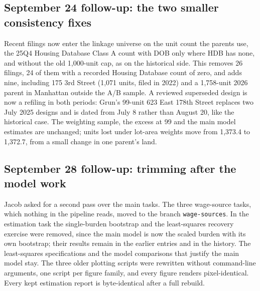 \subsection*{September 24 follow-up: the two smaller consistency fixes}

Recent filings now enter the linkage universe on the unit count the parents
use, the 25Q4 Housing Database Class A count with DOB only where HDB has none,
and without the old 1,000-unit cap, as on the historical side. This removes 26
filings, 24 of them with a recorded Housing Database count of zero, and adds
nine, including 175 3rd Street (1,071 units, filed in 2022) and a 1,758-unit
2026 parent in Manhattan outside the A/B sample. A reviewed superseded design
is now a refiling in both periods: Grun's 99-unit 623 East 178th Street replaces
two July 2025 designs and is dated from July 8 rather than August 20, like the
historical case. The weighting sample, the excess at 99 and the main model
estimates are unchanged; units lost under lot-area weights move from 1,373.4 to
1,372.7, from a small change in one parent's land.

\subsection*{September 28 follow-up: trimming after the model work}

Jacob asked for a second pass over the main tasks. The three wage-source
tasks, which nothing in the pipeline reads, moved to the branch
\texttt{wage-sources}. In the estimation task the single-burden bootstrap and
the least-squares recovery exercise were removed, since the main model is now
the scaled burden with its own bootstrap; their results remain in the
earlier entries and in the history. The least-squares specifications and the
model comparisons that justify the main model stay. The three older plotting
scripts were rewritten without command-line arguments, one script per figure
family, and every figure renders pixel-identical. Every kept estimation report
is byte-identical after a full rebuild.
